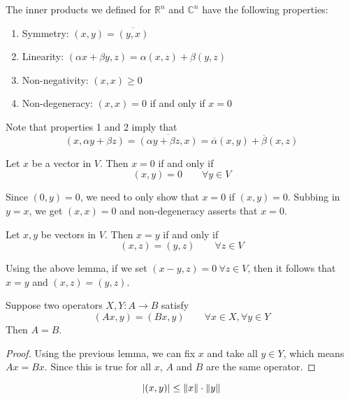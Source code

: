 The inner products we defined for $\mathbb{R}^{n}$ and $\mathbb{C}^{n}$	have the following properties: 
\begin{enumerate}
	\item Symmetry: $(x, y) = \overline{(y, x)}$
	\item Linearity: $(\alpha x + \beta y, z) = \alpha (x, z) + \beta (y, z)$
	\item Non-negativity: $(x, x) \geq 0$ 
	\item Non-degeneracy: $(x, x) = 0$ if and only if $x = 0$
\end{enumerate}

Note that properties 1 and 2 imply that 
$$(x, \alpha y + \beta z) = \overline{(\alpha y + \beta z, x)} = \overline{\alpha} (x, y) + \overline{\beta} (x, z)$$

\begin{lemma}
Let $x$ be a vector in $V$. Then $x = 0$ if and only if  
$$(x, y) = 0 \qquad \forall y \in V$$
\end{lemma}

\begin{lproof}
Since $(0, y) = 0$, we need to only show that $x = 0$ if $(x, y) = 0$. Subbing in $y = x$, we get $(x, x) = 0$ and non-degeneracy asserts that $x = 0$. 
\end{lproof}

\begin{lemma}
Let $x, y$ be vectors in $V$. Then $x = y$ if and only if  
$$(x, z) = (y, z) \qquad \forall z \in V$$
\end{lemma}

\begin{lproof}
Using the above lemma, if we set $(x - y, z) = 0 \: \forall z \in V$, then it follows that $x = y$ and $(x, z) = (y, z)$. 

\end{lproof}

\begin{theorem}
Suppose two operators $X, Y : A \rightarrow B$ satisfy 
$$(Ax, y) = (Bx, y) \qquad \forall x \in X, \forall y \in Y$$
Then $A = B$. 
\end{theorem}

\begin{proof}
Using the previous lemma, we can fix $x$ and take all $y \in Y$, which means $Ax = Bx$. Since this is true for all $x$, $A$ and $B$ are the same operator. 
\end{proof}

\begin{theorem}
$$\abs{(x, y)} \leq \norm{x} \cdot \norm{y}$$
\end{theorem}

